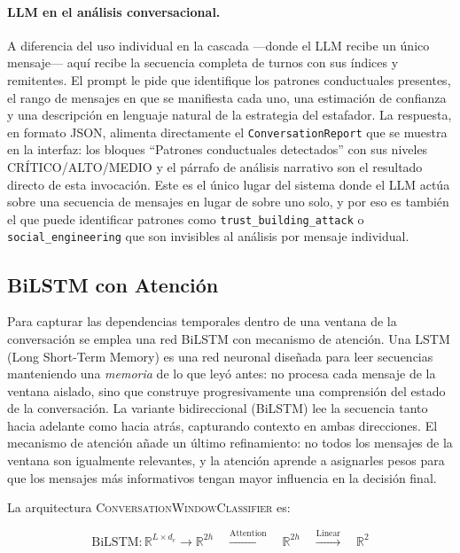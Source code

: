\documentclass{llncs}
\begin{document}
\paragraph{LLM en el análisis conversacional.}
A diferencia del uso individual en la cascada ---donde el LLM
recibe un único mensaje--- aquí recibe la secuencia completa de
turnos con sus índices y remitentes.
El prompt le pide que identifique los patrones conductuales
presentes, el rango de mensajes en que se manifiesta cada uno,
una estimación de confianza y una descripción en lenguaje natural
de la estrategia del estafador.
La respuesta, en formato JSON, alimenta directamente el
\texttt{ConversationReport} que se muestra en la interfaz:
los bloques ``Patrones conductuales detectados'' con sus niveles
\textsc{CRÍTICO}/\textsc{ALTO}/\textsc{MEDIO} y el párrafo
de análisis narrativo son el resultado directo de esta invocación.
Este es el único lugar del sistema donde el LLM actúa sobre
una secuencia de mensajes en lugar de sobre uno solo, y por eso
es también el que puede identificar patrones como
\texttt{trust\_building\_attack} o \texttt{social\_engineering}
que son invisibles al análisis por mensaje individual.

\subsection{BiLSTM con Atención}
\label{sec:conv:bilstm}

Para capturar las dependencias temporales dentro de una ventana
de la conversación se emplea una red BiLSTM con mecanismo de atención.
Una LSTM (Long Short-Term Memory) es una red neuronal diseñada
para leer secuencias manteniendo una \emph{memoria} de lo que leyó
antes: no procesa cada mensaje de la ventana aislado, sino que
construye progresivamente una comprensión del estado de la conversación.
La variante bidireccional (BiLSTM) lee la secuencia tanto hacia
adelante como hacia atrás, capturando contexto en ambas direcciones.
El mecanismo de atención añade un último refinamiento:
no todos los mensajes de la ventana son igualmente relevantes,
y la atención aprende a asignarles pesos para que los mensajes
más informativos tengan mayor influencia en la decisión final.

La arquitectura \textsc{ConversationWindowClassifier} es:

\begin{equation}
  \mathrm{BiLSTM}: \mathbb{R}^{L \times d_e} \to \mathbb{R}^{2h}
  \quad \xrightarrow{\mathrm{Attention}} \quad
  \mathbb{R}^{2h}
  \quad \xrightarrow{\mathrm{Linear}} \quad
  \mathbb{R}^{2}
\end{equation}
\end{document}
